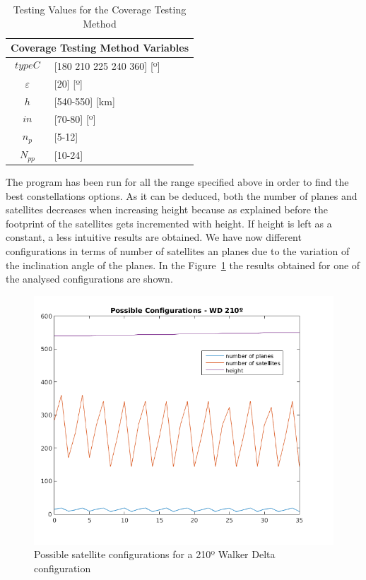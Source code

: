 \begin{table}[H]
\centering
\begin{tabular}{|c|l|}
\hline
\multicolumn{2}{|c|}{Coverage Testing Method Variables}     \\ \hline
$$typeC$$          & {[}180 210 225 240 360{]} {[}º{]} 			 \\ \hline
$\varepsilon$      & {[}20{]} {[}º{]}                         \\ \hline
$$h$$              & {[}540-550{]} {[}km{]}                   \\ \hline
$$in$$             & {[}70-80{]} {[}º{]}                 \\ \hline
$n_{p}$            & {[}5-12{]}                        \\ \hline
$N_{pp}$           & {[}10-24{]}                    \\ \hline
\end{tabular}
\caption{Testing Values for the Coverage Testing Method}
\label{t:varRange}
\end{table}  

The program has been run for all the range specified above in order to find the best constellations options. As it can be deduced, both the number of planes and satellites decreases when increasing height because as explained before the footprint of the satellites gets incremented with height.
If height is left as a constant, a less intuitive results are obtained. We have now different configurations in terms of number of satellites an planes due to the variation of the inclination angle of the planes.
In the Figure~\ref{fig:graph120} the results obtained for one of the analysed configurations are shown. \\

\begin{figure}[H] %
	\centering
	\includegraphics[width=.5\textwidth]{./testing/graph210.png}
	\caption{Possible satellite configurations for a 210º Walker Delta configuration}
	\label{fig:graph120}
\end{figure}

